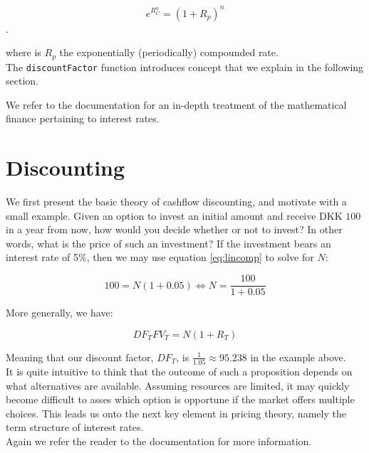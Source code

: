 \begin{equation}
e^{R_C^n} = (1+R_p)^n
\end{equation}.

where is $R_p$ the exponentially (periodically) compounded rate.\\

The \texttt{discountFactor} function introduces concept that we
explain in the following section.

We refer to the \hql documentation\cite{hqldoc} for an in-depth treatment of the
mathematical finance pertaining to interest rates.

\section{Discounting}\label{sec:discounting}

We first present the basic theory of cashflow discounting, and motivate with
a small example. Given an option to invest an initial amount and receive DKK
$100$ in a year from now, how would you decide whether or not to invest? In
other words, what is the price of such an investment? If the investment bears
an interest rate of 5\%, then we may use equation \ref{eq:lincomp} to solve
for $N$:

\begin{equation}
100 = N (1 + 0.05) \Leftrightarrow N = \frac{100}{1+0.05}
\end{equation}

More generally, we have:

\begin{equation}
DF_T FV_T= N (1 + R_T)
\end{equation}

Meaning that our discount factor, $DF_T$, is $\frac{1}{1.05} \approx 95.238$
in the example above.\\

It is quite intuitive to think that the outcome of such a proposition depends 
on what alternatives are available. Assuming resources are limited, it may
quickly become difficult to asses which option is opportune if the market
offers multiple choices. This leads us onto the next key element in pricing
theory, namely the term structure of interest rates.\\

Again we refer the reader to the \hql documentation\cite{hqldoc} for more information.



